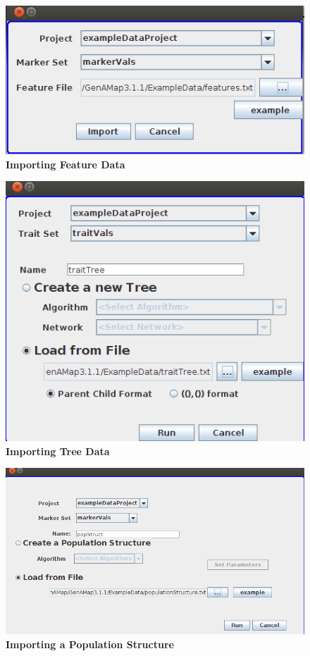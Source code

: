 \documentclass{article}
\begin{document}
\begin{figure}
\includegraphics[width=\textwidth]{Figure7.png}
\caption{\textbf{Importing Feature Data}}
\end{figure}

\begin{figure}
\includegraphics[width=\textwidth]{Figure8.png}
\caption{\textbf{Importing Tree Data}}
\end{figure}

\begin{figure}
\includegraphics[width=\textwidth]{Figure9.png}
\caption{\textbf{Importing a Population Structure}}
\end{figure}
\end{document}
